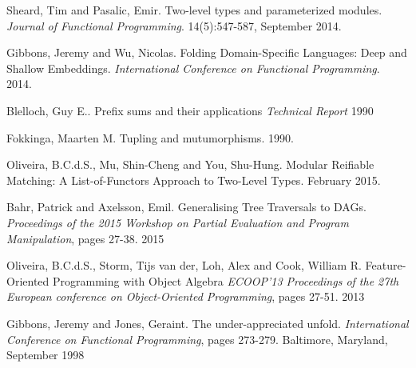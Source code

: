 \documentclass{jfp1}
\begin{document}
\begin{thebibliography}{}

  Sheard, Tim and Pasalic, Emir.
  Two-level types and parameterized modules.
  \emph{Journal of Functional Programming}.
  14(5):547-587, September 2014.

  Gibbons, Jeremy and Wu, Nicolas.
  Folding Domain-Specific Languages: Deep and Shallow Embeddings.
  \emph{International Conference on Functional Programming}.
  2014.

  Blelloch, Guy E..
  Prefix sums and their applications
  \emph{Technical Report}
  1990

  Fokkinga, Maarten M.
  Tupling and mutumorphisms.
  1990.

  Oliveira, B.C.d.S., Mu, Shin-Cheng and You, Shu-Hung.
  Modular Reifiable Matching: A List-of-Functors Approach to Two-Level Types.
  February 2015.

  Bahr, Patrick and Axelsson, Emil.
  Generalising Tree Traversals to DAGs.
  \emph{Proceedings of the 2015 Workshop on Partial Evaluation and Program Manipulation},
  pages 27-38.
  2015

  Oliveira, B.C.d.S., Storm, Tijs van der, Loh, Alex and Cook, William R.
  Feature-Oriented Programming with Object Algebra
  \emph{ECOOP'13 Proceedings of the 27th European conference on Object-Oriented Programming},
  pages 27-51.
  2013

  Gibbons, Jeremy and Jones, Geraint.
  The under-appreciated unfold.
  \emph{International Conference on Functional Programming},
  pages 273-279.
  Baltimore, Maryland, September 1998

\end{thebibliography}
\end{document}
